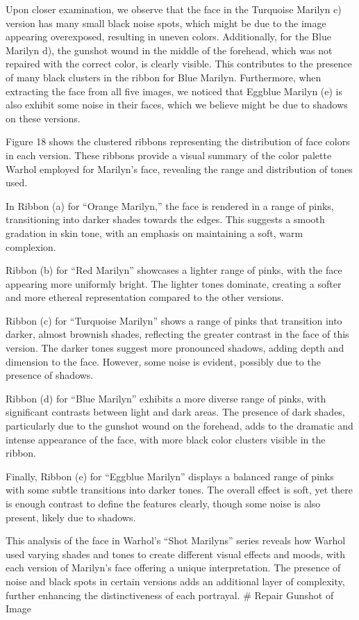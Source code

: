 \documentclass{article}
\begin{document}
Upon closer examination, we observe that the face in the Turquoise
Marilyn c) version has many small black noise spots, which might be due
to the image appearing overexposed, resulting in uneven colors.
Additionally, for the Blue Marilyn d), the gunshot wound in the middle
of the forehead, which was not repaired with the correct color, is
clearly visible. This contributes to the presence of many black clusters
in the ribbon for Blue Marilyn. Furthermore, when extracting the face
from all five images, we noticed that Eggblue Marilyn (e) is also
exhibit some noise in their faces, which we believe might be due to
shadows on these versions.

Figure 18 shows the clustered ribbons representing the distribution of
face colors in each version. These ribbons provide a visual summary of
the color palette Warhol employed for Marilyn's face, revealing the
range and distribution of tones used.

In Ribbon (a) for ``Orange Marilyn,'' the face is rendered in a range of
pinks, transitioning into darker shades towards the edges. This suggests
a smooth gradation in skin tone, with an emphasis on maintaining a soft,
warm complexion.

Ribbon (b) for ``Red Marilyn'' showcases a lighter range of pinks, with
the face appearing more uniformly bright. The lighter tones dominate,
creating a softer and more ethereal representation compared to the other
versions.

Ribbon (c) for ``Turquoise Marilyn'' shows a range of pinks that
transition into darker, almost brownish shades, reflecting the greater
contrast in the face of this version. The darker tones suggest more
pronounced shadows, adding depth and dimension to the face. However,
some noise is evident, possibly due to the presence of shadows.

Ribbon (d) for ``Blue Marilyn'' exhibits a more diverse range of pinks,
with significant contrasts between light and dark areas. The presence of
dark shades, particularly due to the gunshot wound on the forehead, adds
to the dramatic and intense appearance of the face, with more black
color clusters visible in the ribbon.

Finally, Ribbon (e) for ``Eggblue Marilyn'' displays a balanced range of
pinks with some subtle transitions into darker tones. The overall effect
is soft, yet there is enough contrast to define the features clearly,
though some noise is also present, likely due to shadows.

This analysis of the face in Warhol's ``Shot Marilyns'' series reveals
how Warhol used varying shades and tones to create different visual
effects and moods, with each version of Marilyn's face offering a unique
interpretation. The presence of noise and black spots in certain
versions adds an additional layer of complexity, further enhancing the
distinctiveness of each portrayal. \# Repair Gunshot of Image
\end{document}
